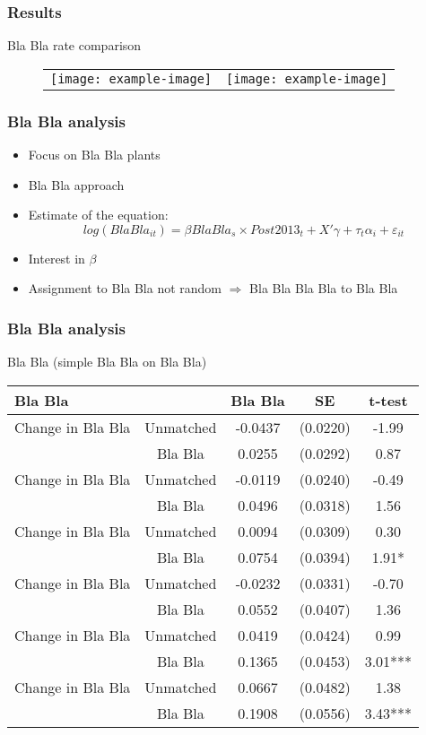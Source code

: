 \documentclass{beamer}
\begin{document}
\begin{frame}
\frametitle{Results}
\begin{center}
Bla Bla rate comparison
\end{center}
\begin{figure}
\centering
\begin{tabular}{cc}
\texttt{[image: example-image]} &
\texttt{[image: example-image]}
\end{tabular}
\end{figure}
\end{frame}

\begin{frame}
\frametitle{Bla Bla analysis}
\begin{itemize}
\item Focus on Bla Bla plants
\item Bla Bla approach
\item Estimate of the equation:
\begin{equation*}
log(Bla Bla_{it})=\beta Bla Bla_{s}\times Post2013_{t}+ X'\gamma + \tau_{t} \alpha_{i}+\varepsilon_{it}
\end{equation*}
\item Interest in $\beta$
\item Assignment to Bla Bla not random $\Rightarrow$ Bla Bla Bla Bla to Bla Bla
\end{itemize}
\end{frame}

\begin{frame}
\frametitle{Bla Bla analysis}
Bla Bla (simple Bla Bla on Bla Bla)
\begin{table}
\centering
\tiny
\label{tab:att}
\begin{tabular}{lcccc}
\toprule
Bla Bla &  & Bla Bla  & SE & t-test\\
\midrule
Change in Bla Bla  & Unmatched & -0.0437 & (0.0220) & -1.99\\
 & Bla Bla & 0.0255 & (0.0292) & 0.87\\
Change in Bla Bla  & Unmatched & -0.0119 & (0.0240) & -0.49\\
 & Bla Bla & 0.0496 & (0.0318) & 1.56\\
Change in Bla Bla & Unmatched & 0.0094 & (0.0309) & 0.30\\
 & Bla Bla & 0.0754 & (0.0394) & 1.91*\\
Change in Bla Bla & Unmatched & -0.0232 & (0.0331) & -0.70\\
 & Bla Bla & 0.0552 & (0.0407) & 1.36\\
Change in Bla Bla & Unmatched & 0.0419 & (0.0424) & 0.99\\
 & Bla Bla & 0.1365 & (0.0453) & 3.01***\\
Change in Bla Bla & Unmatched & 0.0667 & (0.0482) & 1.38\\
 & Bla Bla & 0.1908 & (0.0556) & 3.43***\\
\bottomrule
\end{tabular}
\end{table}
\end{frame}
\end{document}
